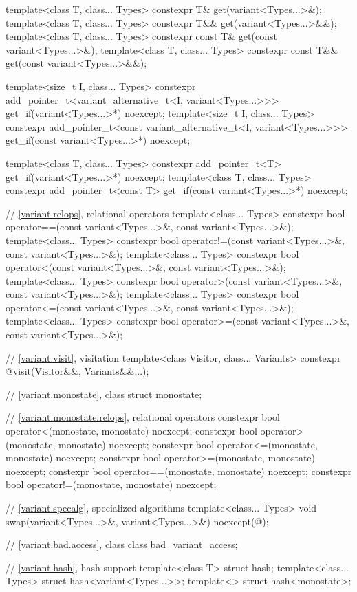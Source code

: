 \begin{codeblock}
{  template<class T, class... Types>
    constexpr T& get(variant<Types...>&);
  template<class T, class... Types>
    constexpr T&& get(variant<Types...>&&);
  template<class T, class... Types>
    constexpr const T& get(const variant<Types...>&);
  template<class T, class... Types>
    constexpr const T&& get(const variant<Types...>&&);

  template<size_t I, class... Types>
    constexpr add_pointer_t<variant_alternative_t<I, variant<Types...>>>
      get_if(variant<Types...>*) noexcept;
  template<size_t I, class... Types>
    constexpr add_pointer_t<const variant_alternative_t<I, variant<Types...>>>
      get_if(const variant<Types...>*) noexcept;

  template<class T, class... Types>
    constexpr add_pointer_t<T>
      get_if(variant<Types...>*) noexcept;
  template<class T, class... Types>
    constexpr add_pointer_t<const T>
      get_if(const variant<Types...>*) noexcept;

  // \ref{variant.relops}, relational operators
  template<class... Types>
    constexpr bool operator==(const variant<Types...>&, const variant<Types...>&);
  template<class... Types>
    constexpr bool operator!=(const variant<Types...>&, const variant<Types...>&);
  template<class... Types>
    constexpr bool operator<(const variant<Types...>&, const variant<Types...>&);
  template<class... Types>
    constexpr bool operator>(const variant<Types...>&, const variant<Types...>&);
  template<class... Types>
    constexpr bool operator<=(const variant<Types...>&, const variant<Types...>&);
  template<class... Types>
    constexpr bool operator>=(const variant<Types...>&, const variant<Types...>&);

  // \ref{variant.visit}, visitation
  template<class Visitor, class... Variants>
    constexpr @\seebelow@ visit(Visitor&&, Variants&&...);

  // \ref{variant.monostate}, class 
  struct monostate;

  // \ref{variant.monostate.relops},  relational operators
  constexpr bool operator<(monostate, monostate) noexcept;
  constexpr bool operator>(monostate, monostate) noexcept;
  constexpr bool operator<=(monostate, monostate) noexcept;
  constexpr bool operator>=(monostate, monostate) noexcept;
  constexpr bool operator==(monostate, monostate) noexcept;
  constexpr bool operator!=(monostate, monostate) noexcept;

  // \ref{variant.specalg}, specialized algorithms
  template<class... Types>
    void swap(variant<Types...>&, variant<Types...>&) noexcept(@\seebelow@);

  // \ref{variant.bad.access}, class 
  class bad_variant_access;

  // \ref{variant.hash}, hash support
  template<class T> struct hash;
  template<class... Types> struct hash<variant<Types...>>;
  template<> struct hash<monostate>;
}
\end{codeblock}

